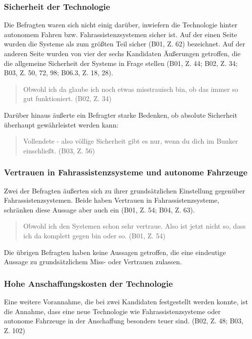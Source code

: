 \documentclass[12pt]{article}
\begin{document}
\subsubsection*{Sicherheit der Technologie}
Die Befragten waren sich nicht einig darüber, inwiefern die Technologie hinter autonomem Fahren bzw. Fahrassistenzsystemen sicher ist. Auf der einen Seite wurden die Systeme als \glqq zum größten Teil sicher\grqq{} (B01, Z. 62) bezeichnet. Auf der anderen Seite wurden von vier der sechs Kandidaten Äußerungen getroffen, die die allgemeine Sicherheit der Systeme in Frage stellen (B01, Z. 44; B02, Z. 34; B03, Z. 50, 72, 98; B06.3, Z. 18, 28).

\begin{quote}
  Obwohl ich da glaube ich noch etwas misstrauisch bin, ob das immer so gut funktioniert. (B02, Z. 34)
\end{quote}

Darüber hinaus äußerte ein Befragter starke Bedenken, ob absolute Sicherheit überhaupt gewährleistet werden kann:

\begin{quote}
  Vollendete - also völlige Sicherheit gibt es nur, wenn du dich im Bunker einschließt. (B03, Z. 56)
\end{quote}

\subsubsection*{Vertrauen in Fahrassistenzsysteme und autonome Fahrzeuge}
Zwei der Befragten äußerten sich zu ihrer grundsätzlichen Einstellung gegenüber Fahrassistenzsystemen. Beide haben Vertrauen in Fahrassistenzsysteme, schränken diese Aussage aber auch ein (B01, Z. 54; B04, Z. 63).

\begin{quote}
  Obwohl ich den Systemen schon sehr vertraue. Also ist jetzt nicht so, dass ich da komplett gegen bin oder so. (B01, Z. 54)
\end{quote}

Die übrigen Befragten haben keine Aussagen getroffen, die eine eindeutige Aussage zu grundsätzlichem Miss- oder Vertrauen zulassen.

\subsubsection*{Hohe Anschaffungskosten der Technologie}
Eine weitere Vorannahme, die bei zwei Kandidaten festgestellt werden konnte, ist die Annahme, dass eine neue Technologie wie Fahrassistenzsysteme oder autonome Fahrzeuge in der Anschaffung besonders teuer sind. (B02, Z. 48; B03, Z. 102)
\end{document}
